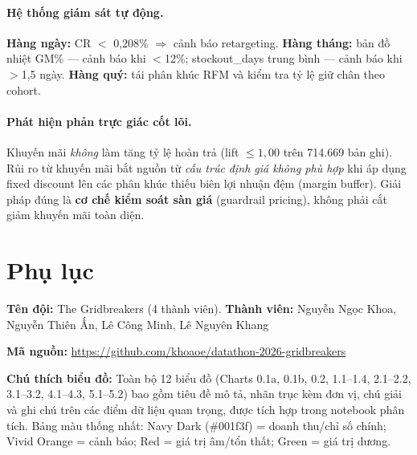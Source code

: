\documentclass{article}
\begin{document}
\paragraph{Hệ thống giám sát tự động.}
\textbf{Hàng ngày:} CR $<$ 0,208\% $\Rightarrow$ cảnh báo retargeting. \textbf{Hàng tháng:} bản đồ nhiệt GM\% --- cảnh báo khi $<$12\%; stockout\_days trung bình --- cảnh báo khi $>$1,5 ngày. \textbf{Hàng quý:} tái phân khúc RFM và kiểm tra tỷ lệ giữ chân theo cohort.

\paragraph{Phát hiện phản trực giác cốt lõi.}
Khuyến mãi \textit{không} làm tăng tỷ lệ hoàn trả (lift $\leq 1,00$ trên 714.669 bản ghi). Rủi ro từ khuyến mãi bắt nguồn từ \textit{cấu trúc định giá không phù hợp} khi áp dụng fixed discount lên các phân khúc thiếu biên lợi nhuận đệm (margin buffer). Giải pháp đúng là \textbf{cơ chế kiểm soát sàn giá} (guardrail pricing), không phải cắt giảm khuyến mãi toàn diện.

\section*{Phụ lục}

\textbf{Tên đội:} The Gridbreakers \quad (4 thành viên).
\textbf{Thành viên:} Nguyễn Ngọc Khoa, Nguyễn Thiên Ấn, Lê Công Minh, Lê Nguyên Khang

\textbf{Mã nguồn:} \url{https://github.com/khoaoe/datathon-2026-gridbreakers}

\textbf{Chú thích biểu đồ:} Toàn bộ 12 biểu đồ (Charts 0.1a, 0.1b, 0.2, 1.1--1.4, 2.1--2.2, 3.1--3.2, 4.1--4.3, 5.1--5.2) bao gồm tiêu đề mô tả, nhãn trục kèm đơn vị, chú giải và ghi chú trên các điểm dữ liệu quan trọng, được tích hợp trong notebook phân tích. Bảng màu thống nhất: Navy Dark (\#001f3f) = doanh thu/chỉ số chính; Vivid Orange = cảnh báo; Red = giá trị âm/tổn thất; Green = giá trị dương.
\end{document}
